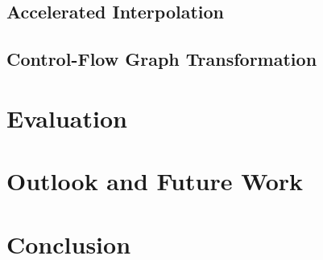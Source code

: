 \documentclass[11pt]{article}
\begin{document}
\subsection{Accelerated Interpolation}

\label{accelInterpol}
\subsection{Control-Flow Graph Transformation}

\label{icfgTransformation}

\section{Evaluation}
\label{eval}


\section{Outlook and Future Work}
\label{futrWork}


\section{Conclusion}
\label{concl}



\pagebreak


\end{document}
